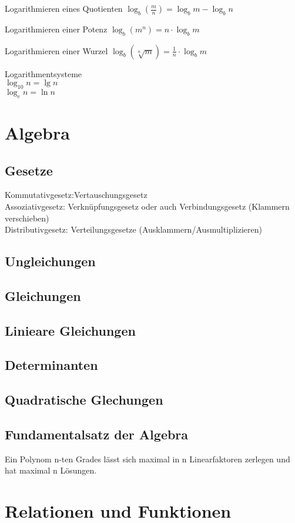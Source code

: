 \documentclass[12pt,a4paper,fleqn,twoside,pdf,final]{article}
\begin{document}
Logarithmieren eines Quotienten $\log_b (\frac{m}{n}) = \log_b m - \log_b n  $ 

Logarithmieren einer Potenz $\log_b (m^n) =  n \cdot \log_b m $ 

Logarithmieren einer Wurzel $\log_b (\sqrt[n]{m}) =  \frac{1}{n} \cdot \log_b m $ 

Logarithmentsysteme \\
$\log_{10} n = \lg n $\\
$\log_{e} n = \ln n $


\section{Algebra}
\subsection{Gesetze}
Kommutativgesetz:Vertauschungsgesetz \\
Assoziativgesetz: Verknüpfungsgesetz oder auch Verbindungsgesetz (Klammern verschieben) \\
Distributivgesetz: Verteilungsgesetze (Ausklammern/Ausmultiplizieren)

\subsection{Ungleichungen}
\subsection{Gleichungen}
\subsection{Linieare Gleichungen}
\subsection{Determinanten}
\subsection{Quadratische Glechungen}
\subsection{Fundamentalsatz der Algebra}
Ein Polynom n-ten Grades lässt sich maximal in n Linearfaktoren zerlegen und hat maximal n Lösungen.

\section{Relationen und Funktionen}
\end{document}
